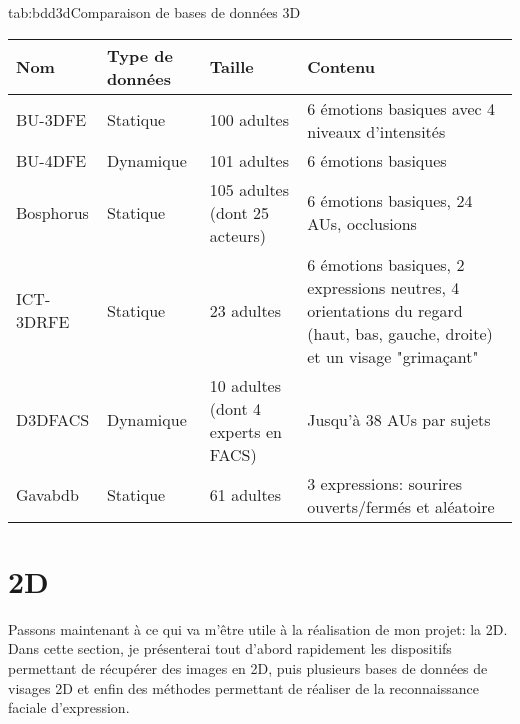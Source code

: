 \documentclass[poster]{polytech/polytech}
\begin{document}
\begin{Table}{tab:bdd3d}{Comparaison de bases de données 3D}
	\begin{tabular}{|p{2.5cm}|p{2cm}|p{3.5cm}|p{6cm}|}
		\hline
		\textbf{Nom} &\textbf{Type de \mbox{données}} &\textbf{Taille} &\textbf{Contenu}\\\hline
		BU-3DFE\cite{bu3dfe_article} &Statique &100 adultes &6 émotions basiques avec 4 niveaux d'intensités\\
		BU-4DFE\cite{bu4dfe_article} &Dynamique &101 adultes &6 émotions basiques\\
		Bosphorus\cite{bosphorus_article} &Statique &105 adultes (dont 25 acteurs) &6 émotions basiques, 24 AUs, occlusions\\
		ICT-3DRFE\cite{ict_3drfe} &Statique &23 adultes &6 émotions basiques, 2 expressions neutres, 4 orientations du regard (haut, bas, gauche, droite) et un visage "grimaçant"\\
		D3DFACS\cite{d3dfacs} &Dynamique &10 adultes (dont 4 experts en FACS) &Jusqu'à 38 AUs par sujets\\
		Gavabdb\cite{gavabdb} &Statique &61 adultes &3 expressions: sourires ouverts/fermés et aléatoire\\\hline
	\end{tabular}
\end{Table}


\newpage
\section{2D}
\label{sec:2d}
Passons maintenant à ce qui va m'être utile à la réalisation de mon projet: la 2D.\\
Dans cette section, je présenterai tout d'abord rapidement les dispositifs permettant de récupérer des images en 2D, puis plusieurs bases de données de visages 2D et enfin des méthodes permettant de réaliser de la reconnaissance faciale d'expression.\\
\end{document}
